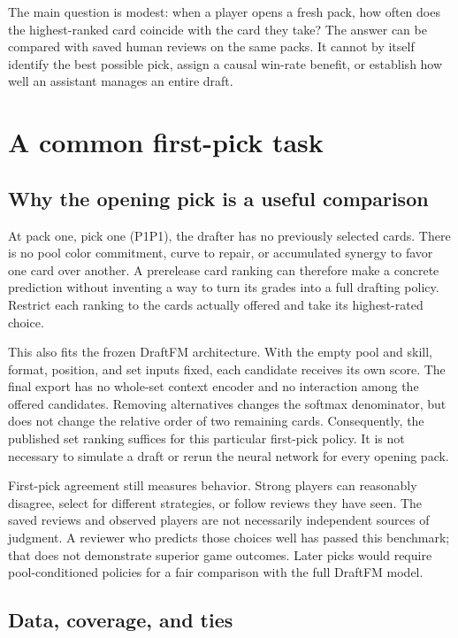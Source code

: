 \documentclass[11pt]{article}
\begin{document}
The main question is modest: when a player opens a fresh pack, how often
does the highest-ranked card coincide with the card they take? The answer
can be compared with saved human reviews on the same packs. It cannot by
itself identify the best possible pick, assign a causal win-rate benefit, or
establish how well an assistant manages an entire draft.

\section{A common first-pick task}

\subsection{Why the opening pick is a useful comparison}

At pack one, pick one (P1P1), the drafter has no previously selected cards.
There is no pool color commitment, curve to repair, or accumulated synergy
to favor one card over another. A prerelease card ranking can therefore
make a concrete prediction without inventing a way to turn its grades into
a full drafting policy. Restrict each ranking to the cards actually offered
and take its highest-rated choice.

This also fits the frozen DraftFM architecture. With the empty pool and
skill, format, position, and set inputs fixed, each candidate receives its
own score. The final export has no whole-set context encoder and no
interaction among the offered candidates. Removing alternatives changes
the softmax denominator, but does not change the relative order of two
remaining cards. Consequently, the published set ranking suffices for this
particular first-pick policy. It is not necessary to simulate a draft or
rerun the neural network for every opening pack.

First-pick agreement still measures behavior. Strong players can reasonably
disagree, select for different strategies, or follow reviews they have seen.
The saved reviews and observed players are not necessarily independent
sources of judgment. A reviewer who predicts those choices well has passed
this benchmark; that does not demonstrate superior game outcomes. Later
picks would require pool-conditioned policies for a fair comparison with
the full DraftFM model.

\subsection{Data, coverage, and ties}
\end{document}
